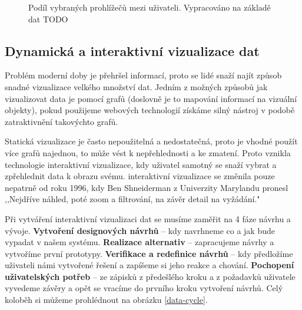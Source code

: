 \begin{figure}[H]
\centering
{}
\caption{Podíl vybraných prohlížečů mezi uživateli. Vypracováno na základě dat TODO}
\label{browser-share}
\end{figure}
\subsection{Dynamická a interaktivní vizualizace dat}
\par Problém moderní doby je přehršel informací, proto se lidé snaží najít způsob snadné vizualizace velkého množství dat. Jedním z možných způsobů jak vizualizovat data je pomocí grafů (doslovně je to mapování informací na vizuální objekty), pokud použijeme webových technologií získáme silný nástroj v podobě zatraktivnění takovýchto grafů. \cite{interactive-data-reily}

\par Statická vizualizace je často nepoužitelná a nedostatečná, proto je vhodné použít více grafů najednou, to může vést k nepřehlednosti a ke zmatení. Proto vznikla technologie interaktivní vizualizace, kdy uživatel samotný se snaží vybrat a zpřehlednit data k obrazu svému. interaktivní vizualizace se změnila pouze nepatrně od roku 1996, kdy Ben Shneiderman z Univerzity Marylandu pronesl ,,Nejdříve náhled, poté zoom a filtrování, na závěr detail na vyžádání."\cite{interactive-data-reily}

\par Při vytváření interaktivní vizualizaci dat se musíme zaměřit na 4 fáze návrhu a vývoje. \textbf{Vytvoření designových návrhů} -- kdy navrhneme co a jak bude vypadat v našem systému. \textbf{Realizace alternativ} -- zapracujeme návrhy a vytvoříme první prototypy. \textbf{Verifikace a redefinice návrhů} -- kdy předložíme uživateli námi vytvořené řešení a zapíšeme si jeho reakce a chování. \textbf{Pochopení uživatelských potřeb} -- ze zápisků z předešlého kroku a z požadavků uživatele vyvedeme závěry a opět se vracíme do prvního kroku vytvoření návrhů. Celý koloběh si můžeme prohlédnout na obrázku \ref{data-cycle}. \cite{the-ux-book}

